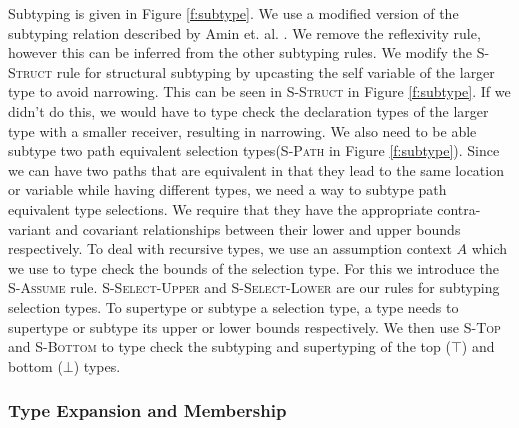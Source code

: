 \documentclass[11pt
              , a4paper
              , twoside
              , openright
              ]{report}
\numberwithin{case}{theorem}
\numberwithin{subcase}{case}
\begin{document}
Subtyping is given in Figure \ref{f:subtype}. We use a 
modified version of the subtyping relation 
described by Amin et. al. \cite{Amin:2014:FPT:2660193.2660216}. We remove the reflexivity rule, however this can be inferred from the other subtyping rules. We modify the \textsc{S-Struct} rule for structural subtyping by upcasting the self variable of the larger type to avoid narrowing. This can be seen in \textsc{S-Struct} in Figure \ref{f:subtype}.
If we didn't do this, we would have to type check the declaration types of the larger type with a smaller receiver, resulting in narrowing. We also need to be able subtype two path equivalent selection types(\textsc{S-Path} in Figure \ref{f:subtype}). Since we can have two paths that are equivalent in that they lead to the same location or variable while having different types, we need a way to subtype path equivalent type selections. We require that they have the appropriate contra-variant and covariant relationships between their lower and upper bounds respectively. To deal with recursive types, we use an assumption context $A$ which we use to type check the bounds of the selection type. For this we introduce the \textsc{S-Assume} rule. \textsc{S-Select-Upper} and \textsc{S-Select-Lower} are our rules for subtyping selection types. To supertype or subtype a selection type, a type needs to supertype or subtype its upper or lower bounds respectively. We then use \textsc{S-Top} and \textsc{S-Bottom} to type check the subtyping and supertyping of the top ($\top$) and bottom ($\bot$) types.



\subsubsection{Type Expansion and Membership}
\end{document}
